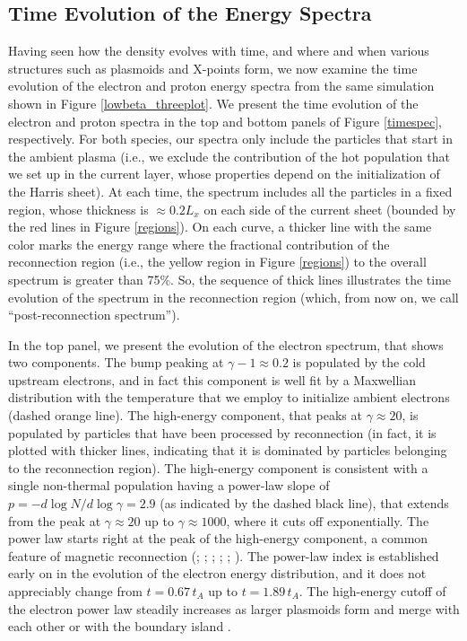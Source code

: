 \subsection{Time Evolution of the Energy Spectra}
Having seen how the density evolves with time, and where and when various structures such as plasmoids and X-points form, we now examine the time evolution of the electron and proton energy spectra from the same simulation shown in Figure \ref{lowbeta_threeplot}.  We present the time evolution of the electron and proton spectra in the top and bottom panels of Figure \ref{timespec}, respectively. For both species, our spectra only include the particles that start in the ambient plasma (i.e., we exclude the contribution of the hot population that we set up in the current layer, whose properties depend on the initialization of the Harris sheet).  At each time, the spectrum includes all the particles in a fixed region, whose thickness is $\approx 0.2 L_{x}$ on each side of the current  sheet (bounded by the red lines in Figure \ref{regions}). On each curve, a thicker line with the same color marks the energy range where the fractional contribution of the reconnection region (i.e., the yellow region in Figure \ref{regions}) to the overall spectrum is greater than 75\%. So, the sequence of thick lines illustrates the time evolution of the spectrum in the reconnection region (which, from now on, we call ``post-reconnection spectrum'').

In the top panel,  we present the evolution of the electron spectrum, that shows two components. The bump peaking at $\gamma-1 \approx 0.2$ is populated by the cold upstream electrons, and in fact this component is well fit by a Maxwellian distribution with the  temperature that we employ to initialize ambient electrons (dashed orange line). The high-energy component, that peaks at $\gamma \approx 20$, is populated by particles that have been processed by reconnection (in fact, it is plotted with thicker lines, indicating that it is dominated by particles belonging to the reconnection region). The high-energy component is consistent with a single non-thermal population having a power-law slope of $p=-d\log{N}/d\log{\gamma}=2.9$ (as indicated by the dashed black line), that extends from the peak at $\gamma \approx 20$ up to $\gamma\approx1000$, where it cuts off exponentially. The power law starts right at the peak of the high-energy component, a common feature of magnetic reconnection (\citealt{sironi2014}; \citealt{melzani2014b, melzani2014}; \citealt{cerutti2012, cerutti2014, cerutti2017}; \citealt{guo2015}; \citealt{liguo2015};  \citealt{werner2018}). The power-law index is established early on in the evolution of the electron energy distribution, and it does not appreciably change from $t=0.67\,t_{A}$ up to $t=1.89\,t_{A}$. The high-energy cutoff of the electron power law  steadily increases as larger plasmoids form and merge with each other or with the boundary island \citep{sironi2016}. 

